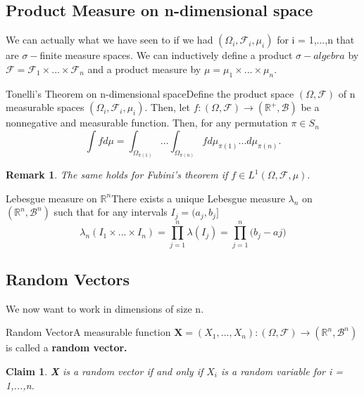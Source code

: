 \documentclass[twoside]{article}
\newtheorem{claim}[theorem]{Claim}
\newtheorem{remark}[theorem]{Remark}
\newcommand{\sigmalgebra}{\mathcal{F}}
\newcommand{\borelsigmaalgebra}{\mathcal{B}}
\newcommand{\sa}{\sigma-algebra}
\newcommand{\positivereal}{\mathbb{R}^+}
\begin{document}
\subsection{Product Measure on n-dimensional space}

We can actually what we have seen to if we had $(\Omega_i, \sigmalgebra_i, \mu_i)$ for i = 1,...,n that are $\sigma-$finite measure spaces. We can inductively define a product $\sa$ by $\sigmalgebra = \sigmalgebra_1 \times ... \times \sigmalgebra_n$ and a product measure by $\mu = \mu_1 \times ... \times \mu_n.$ 

\begin{proposition_exam}{Tonelli's Theorem on n-dimensional space}{}Define the product space $(\Omega, \sigmalgebra)$ of n measurable spaces $(\Omega_i, \sigmalgebra_i, \mu_i)$. Then, let $f:(\Omega, \sigmalgebra) \rightarrow (\positivereal, \borelsigmaalgebra)$ be a nonnegative and measurable function. Then, for any permutation $\pi \in S_n$
$$
\int fd\mu = \int_{\Omega_{\pi(1)}}...\int_{\Omega_{\pi(n)}}fd\mu_{\pi(1)}...d\mu_{\pi(n)}.
$$
\end{proposition_exam}

\begin{remark}The same holds for Fubini's theorem if $f \in L^1(\Omega, \sigmalgebra, \mu).$
\end{remark}

\begin{proposition_exam}{Lebesgue measure on $\mathbb{R}^n$}{}There exists a unique Lebesgue measure $\lambda_n$ on $(\mathbb{R}^n, \borelsigmaalgebra^n)$ such that for any intervals $I_j = (a_j,b_j]$ 
$$
\lambda_n(I_1 \times ... \times I_n) = \prod_{j=1}^{n}\lambda(I_j) = \prod_{j=1}^{n}\bigg(b_j - aj \bigg)
$$
\end{proposition_exam}

\subsection{Random Vectors}
We now want to work in dimensions of size n.

\begin{definition_exam}{Random Vector}{}A measurable function $\textbf{X} = (X_1,...,X_n): (\Omega, \sigmalgebra) \rightarrow (\mathbb{R}^n, \borelsigmaalgebra^n)$ is called a \textbf{random vector.}
\end{definition_exam}

\begin{claim}\textbf{X} is a random vector if and only if $X_i$ is a random variable for i = 1,...,n.
\end{claim}
\end{document}
